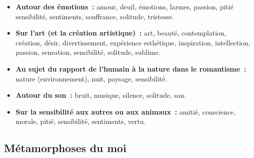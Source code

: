 \begin{itemize}\setlength{\itemsep}{6pt}

\item \textbf{Autour des émotions~:} amour, deuil, émotions, larmes, passion, pitié sensibilité, sentiments, souffrance, solitude, tristesse.

\item \textbf{Sur l'art (et la création artistique)~:} art, beauté, contemplation, création, désir, divertissement, expérience esthétique, inspiration, intellection, passion, sensation, sensibilité, solitude, sublime.

\item \textbf{Au sujet du rapport de l'humain à la nature dans le romantisme~:} nature (environnement), nuit, paysage, sensibilité.

\item \textbf{Autour du son~:} bruit, musique, silence, solitude, son.

\item \textbf{Sur la sensibilité aux autres ou aux animaux~:} amitié, conscience, morale, pitié, sensibilité, sentiments, vertu.

\end{itemize}


\subsection{Métamorphoses du moi}

